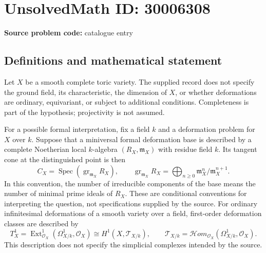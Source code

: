 \documentclass[11pt]{article}
\begin{document}
\section*{UnsolvedMath ID: 30006308}
\textbf{Source problem code:} catalogue entry
\subsection{Definitions and mathematical statement}
Let \(X\) be a smooth complete toric variety. The supplied record does not specify the ground field, its characteristic, the dimension of \(X\), or whether deformations are ordinary, equivariant, or subject to additional conditions. Completeness is part of the hypothesis; projectivity is not assumed.

For a possible formal interpretation, fix a field \(k\) and a deformation problem for \(X\) over \(k\). Suppose that a miniversal formal deformation base is described by a complete Noetherian local \(k\)-algebra \((R_X,\mathfrak m_X)\) with residue field \(k\). Its tangent cone at the distinguished point is then
\[
C_X=\operatorname{Spec}\!\left(\operatorname{gr}_{\mathfrak m_X}R_X\right),\qquad
\operatorname{gr}_{\mathfrak m_X}R_X
=\bigoplus_{n\geq 0}\mathfrak m_X^n/\mathfrak m_X^{n+1}.
\]
In this convention, the number of irreducible components of the base means the number of minimal prime ideals of \(R_X\). These are conditional conventions for interpreting the question, not specifications supplied by the source. For ordinary infinitesimal deformations of a smooth variety over a field, first-order deformation classes are described by
\[
T_X^1=\operatorname{Ext}^1_{\mathcal O_X}(\Omega^1_{X/k},\mathcal O_X)
\cong H^1(X,\mathcal T_{X/k}),\qquad
\mathcal T_{X/k}=\mathcal H om_{\mathcal O_X}(\Omega^1_{X/k},\mathcal O_X).
\]
This description does not specify the simplicial complexes intended by the source.
\end{document}
